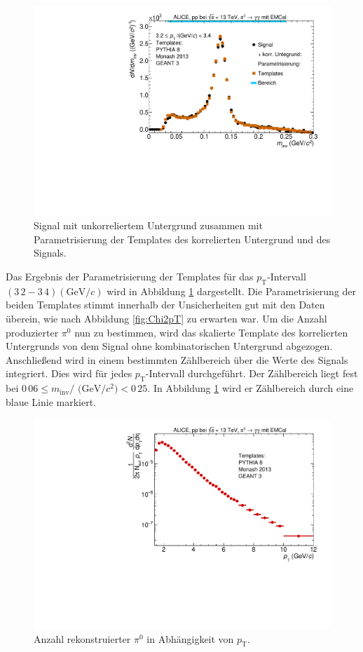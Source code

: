 \begin{figure}[t!]
\centering
\includegraphics[width=.65\linewidth]{ParamResult_Bin10_Data_2016.pdf}
\caption{Signal mit unkorreliertem Untergrund zusammen mit Parametrisierung der Templates des korrelierten Untergrund und des Signals.
}
\label{fig:ParamResult}
\end{figure}
Das Ergebnis der Parametrisierung der Templates für das $p_\text{T}$-Intervall $(3\,2-3\,4)(\text{GeV/}c)$ wird in Abbildung \ref{fig:ParamResult} dargestellt.
Die Parametrisierung der beiden Templates stimmt innerhalb der Unsicherheiten gut mit den Daten überein, wie nach Abbildung \ref{fig:Chi2pT} zu erwarten war.
\newline
Um die Anzahl produzierter $\pi^{0}$ nun zu bestimmen, wird das skalierte Template des korrelierten Untergrunds von dem Signal ohne kombinatorischen Untergrund abgezogen.
Anschließend wird in einem bestimmten Zählbereich über die Werte des Signals integriert.
Dies wird für jedes $p_\text{T}$-Intervall durchgeführt.
\newline
Der Zählbereich liegt fest bei $0\,06 \leq m_\text{inv}/\text{ (GeV}/c^{2}) < 0\,25$.
In Abbildung \ref{fig:ParamResult} wird er Zählbereich durch eine blaue Linie markiert.
\begin{figure}[t!]
\centering
\includegraphics[width=.65\linewidth]{UncorrYields_Data_2016.pdf}
\caption{Anzahl rekonstruierter $\pi^{0}$ in Abhängigkeit von $p_\text{T}$.
}
\label{fig:RawYield}
\end{figure}
